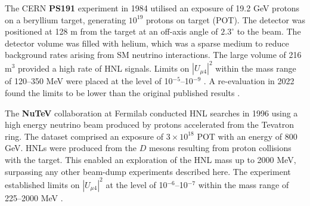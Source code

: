 \begin{coloritemize}

\item The CERN \textbf{PS191} experiment in 1984 utilised an exposure of 19.2 GeV protons on a beryllium target, generating $10^{19}$ protons on target (POT).
The detector was positioned at 128 m from the target at an off-axis angle of $2.3^{\circ}$ to the beam.
The detector volume was filled with helium, which was a sparse medium to reduce background rates arising from SM neutrino interactions.
The large volume of 216 m$^3$ provided a high rate of HNL signals. 
Limits on $|U_{\mu4}|^{2}$ within the mass range of 120--350 MeV were placed at the level of 10$^{-5}$--10$^{-9}$ \cite{PS191A, PS191B}.
A re-evaluation in 2022 found the limits to be lower than the original published results \cite{PS191C}.
	

\item The \textbf{NuTeV} collaboration at Fermilab conducted HNL searches in 1996 using a high energy neutrino beam produced by protons accelerated from the Tevatron ring.
The dataset comprised an exposure of $3 \times 10^{18}$ POT with an energy of 800 GeV.
HNLs were produced from the $D$ mesons resulting from proton collisions with the target.
This enabled an exploration of the HNL mass up to 2000 MeV, surpassing any other beam-dump experiments described here.
The experiment established limits on $|U_{\mu4}|^{2}$ at the level of 10$^{-6}$--10$^{-7}$ within the mass range of 225--2000 MeV \cite{NuTeV}.


\end{coloritemize}
